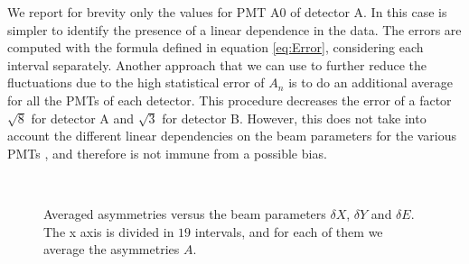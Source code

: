 We report for brevity only the values for PMT A0 of detector A. In this case is simpler to identify the presence of a linear dependence in the data. The errors are computed with the formula defined in equation \ref{eq:Error}, considering each interval separately.
Another approach that we can use to further reduce the fluctuations due to the high statistical error of $A_{n}$ is to do an additional average for all the PMTs of each detector. This procedure decreases the error of a factor $\sqrt{8}$ for detector A and $\sqrt{3}$ for detector B. However, this does not take into account the different linear dependencies on the beam parameters for the various PMTs , and therefore is not immune from a possible bias. 

\begin{figure}[hbtp]
\centering
{}
\\
\caption{Averaged asymmetries versus the beam parameters $\delta X$, $\delta Y$ and $\delta E$. The x axis is divided in $19$ intervals, and for each of them we average the asymmetries $A$. }
\label{fig:DifferentModels}
\end{figure}

